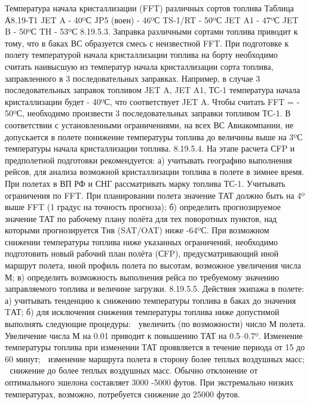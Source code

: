 Температура начала кристаллизации (FFT) различных сортов топлива
                                                                                                                             Таблица А8.19-Т1
                 JET A	- 40ºС		JP5 (воен)	- 46ºС		TS-1/RT	- 50ºС
                 JET A1	- 47ºС		JET B	- 50ºС		TH	- 53ºС
8.19.5.3. Заправка различными сортами топлива приводит к тому, что в баках ВС образуется смесь с неизвестной FFT. При подготовке к полету температурой начала кристаллизации топлива на борту необходимо считать наивысшую из температур начала кристаллизации сорта топлива, заправленного в 3 последовательных заправках.
Например, в случае 3 последовательных заправок топливом JET A, JET A1, ТС-1 температура начала кристаллизации будет - 40ºС, что соответствует JET A. Чтобы считать FFT = - 50ºС, необходимо произвести 3 последовательных заправки топливом ТС-1. В соответствии с установленными ограничениями, на всех ВС Авиакомпании, не допускается в полете понижение температуры топлива до величины выше на 3ºС температуры начала кристаллизации топлива.
8.19.5.4. На этапе расчета СFP и предполетной подготовки рекомендуется:
а)	учитывать географию выполнения рейсов, для анализа возможной кристаллизации топлива в полете в зимнее время. При полетах в ВП РФ и СНГ рассматривать марку топлива ТС-1. Учитывать ограничения по FFT. При планировании полета значение ТАТ должно быть на 4º выше FFT (1 градус на точность прогноза);
б)	определить прогнозируемое значение ТАТ по рабочему плану полёта для тех поворотных пунктов, над которыми прогнозируется Тнв (SAT/OAT) ниже -64ºС. При возможном снижении температуры топлива ниже указанных ограничений, необходимо подготовить новый рабочий план полёта (СFP), предусматривающий иной маршрут полета, иной профиль полета по высотам, возможное увеличения числа М;
в)	определить возможность выполнения рейса по требуемому значению заправляемого топлива и величине загрузки.
8.19.5.5. Действия экипажа в полете:
а)	учитывать тенденцию к снижению температуры топлива в баках до значения TАТ;
б)	для исключения снижения температуры топлива ниже допустимой выполнять следующие процедуры:
	увеличить (по возможности) число М полета. Увеличение числа М на 0.01 приводит к повышению ТАТ на 0.5–0.7º. Изменение температуры топлива при изменении ТАТ проявляется в течение периода от 15 до 60 минут;
	изменение маршрута полета в сторону более теплых воздушных масс;
	снижение до более теплых воздушных масс. Обычно отклонение от оптимального эшелона составляет 3000 -5000 футов. При экстремально низких температурах, возможно, потребуется снижение до 25000 футов.
